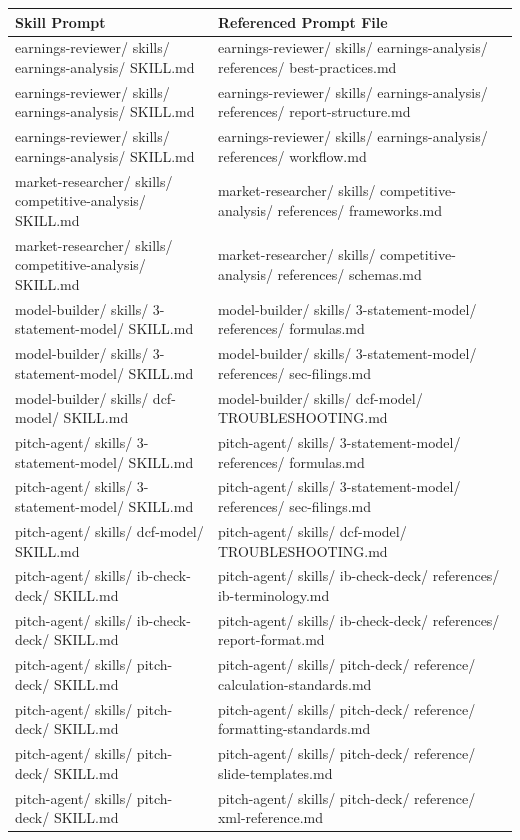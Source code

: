 \documentclass[11pt]{article}
\begin{document}
\begingroup
\small
\setlength{\tabcolsep}{2pt}
\begin{longtable}{>{\RaggedRight\arraybackslash\hspace{0pt}}p{}>{\RaggedRight\arraybackslash\hspace{0pt}}p{}}
\toprule
{} \textbf{Skill Prompt} & \textbf{Referenced Prompt File} \\
\midrule
{} earnings-reviewer/ skills/ earnings-analysis/ SKILL.md & earnings-reviewer/ skills/ earnings-analysis/ references/ best-practices.md \\
{} earnings-reviewer/ skills/ earnings-analysis/ SKILL.md & earnings-reviewer/ skills/ earnings-analysis/ references/ report-structure.md \\
{} earnings-reviewer/ skills/ earnings-analysis/ SKILL.md & earnings-reviewer/ skills/ earnings-analysis/ references/ workflow.md \\
{} market-researcher/ skills/ competitive-analysis/ SKILL.md & market-researcher/ skills/ competitive-analysis/ references/ frameworks.md \\
{} market-researcher/ skills/ competitive-analysis/ SKILL.md & market-researcher/ skills/ competitive-analysis/ references/ schemas.md \\
{} model-builder/ skills/ 3-statement-model/ SKILL.md & model-builder/ skills/ 3-statement-model/ references/ formulas.md \\
{} model-builder/ skills/ 3-statement-model/ SKILL.md & model-builder/ skills/ 3-statement-model/ references/ sec-filings.md \\
{} model-builder/ skills/ dcf-model/ SKILL.md & model-builder/ skills/ dcf-model/ TROUBLESHOOTING.md \\
{} pitch-agent/ skills/ 3-statement-model/ SKILL.md & pitch-agent/ skills/ 3-statement-model/ references/ formulas.md \\
{} pitch-agent/ skills/ 3-statement-model/ SKILL.md & pitch-agent/ skills/ 3-statement-model/ references/ sec-filings.md \\
{} pitch-agent/ skills/ dcf-model/ SKILL.md & pitch-agent/ skills/ dcf-model/ TROUBLESHOOTING.md \\
{} pitch-agent/ skills/ ib-check-deck/ SKILL.md & pitch-agent/ skills/ ib-check-deck/ references/ ib-terminology.md \\
{} pitch-agent/ skills/ ib-check-deck/ SKILL.md & pitch-agent/ skills/ ib-check-deck/ references/ report-format.md \\
{} pitch-agent/ skills/ pitch-deck/ SKILL.md & pitch-agent/ skills/ pitch-deck/ reference/ calculation-standards.md \\
{} pitch-agent/ skills/ pitch-deck/ SKILL.md & pitch-agent/ skills/ pitch-deck/ reference/ formatting-standards.md \\
{} pitch-agent/ skills/ pitch-deck/ SKILL.md & pitch-agent/ skills/ pitch-deck/ reference/ slide-templates.md \\
{} pitch-agent/ skills/ pitch-deck/ SKILL.md & pitch-agent/ skills/ pitch-deck/ reference/ xml-reference.md \\
\bottomrule
\end{longtable}
\endgroup
\end{document}

